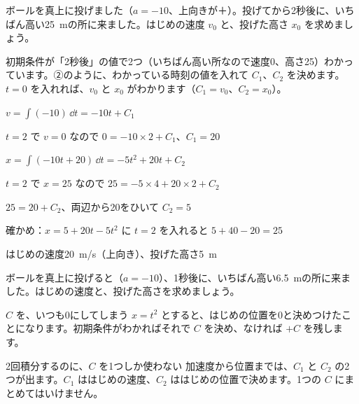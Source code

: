\begin{reidai}
ボールを真上に投げました（$a=-10$、上向きが＋）。投げてから2秒後に、いちばん高い\qty{25}{m}の所に来ました。はじめの速度 $v_0$ と、投げた高さ $x_0$ を求めましょう。\par
\kangaekata 初期条件が「2秒後」の値で2つ（いちばん高い所なので速度0、高さ25）わかっています。②のように、わかっている時刻の値を入れて $C_1$、$C_2$ を決めます。$t=0$ を入れれば、$v_0$ と $x_0$ がわかります（$C_1=v_0$、$C_2=x_0$）。\par
\shiki $\displaystyle v=\int(-10)\,\dd t=-10t+C_1$\par
\hspace*{2.6\zw}$t=2$ で $v=0$ なので $0=-10\times2+C_1$、$C_1=20$\par
\hspace*{2.6\zw}$\displaystyle x=\int(-10t+20)\,\dd t=-5t^2+20t+C_2$\par
\hspace*{2.6\zw}$t=2$ で $x=25$ なので $25=-5\times4+20\times2+C_2$\par
\hspace*{2.6\zw}$25=20+C_2$、両辺から20をひいて $C_2=5$\par
\hspace*{2.6\zw}確かめ：$x=5+20t-5t^2$ に $t=2$ を入れると $5+40-20=25$\par
\kotae はじめの速度\qty{20}{m/s}（上向き）、投げた高さ\qty{5}{m}
\end{reidai}

\begin{jibun}
ボールを真上に投げると（$a=-10$）、1秒後に、いちばん高い\qty{6.5}{m}の所に来ました。はじめの速度と、投げた高さを求めましょう。
\end{jibun}


\begin{tsumazuki}{$C$ を、いつも0にしてしまう}
$x=t^2$ とすると、はじめの位置を0と決めつけたことになります。初期条件がわかればそれで $C$ を決め、なければ $+C$ を残します。
\end{tsumazuki}

\begin{tsumazuki}{2回積分するのに、$C$ を1つしか使わない}
加速度から位置までは、$C_1$ と $C_2$ の2つが出ます。$C_1$ ははじめの速度、$C_2$ ははじめの位置で決めます。1つの $C$ にまとめてはいけません。
\end{tsumazuki}

